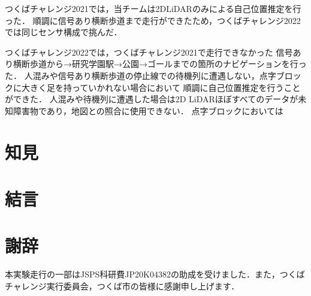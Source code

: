 \documentclass[twocolumn,9pt]{jsproceedings}
\begin{document}
つくばチャレンジ2021では，当チームは2DLiDARのみによる自己位置推定を行った\cite{RTshop}．
順調に信号あり横断歩道まで走行ができたため，つくばチャレンジ2022では同じセンサ構成で挑んだ．

つくばチャレンジ2022では，つくばチャレンジ2021で走行できなかった
信号あり横断歩道から→研究学園駅→公園→ゴールまでの箇所のナビゲーションを行った．
人混みや信号あり横断歩道の停止線での待機列に遭遇しない，点字ブロックに大きく足を持っていかれない場合において
順調に自己位置推定を行うことができた．
人混みや待機列に遭遇した場合は2D LiDARほぼすべてのデータが未知障害物であり，地図との照合に使用できない．
点字ブロックにおいては

\section{知見}


\section{結言}

\section*{謝辞}

本実験走行の一部はJSPS科研費JP20K04382の助成を受けました．また，つくばチャレンジ実行委員会，つくば市の皆様に感謝申し上げます．

\end{document}

